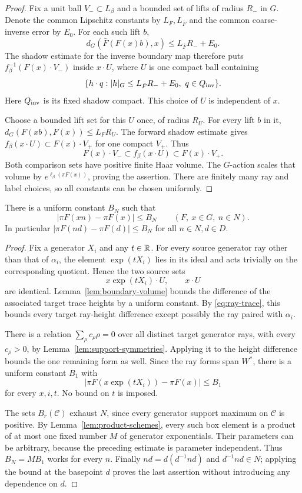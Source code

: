 \begin{proof}
Fix a unit ball $V_-\subset L_\beta$ and a bounded set of lifts
of radius $R_-$ in $G$.  Denote the common Lipschitz constants
by $L_F,L_{\bar F}$ and the common coarse-inverse error by $E_0$.
For each such lift $b$,
\[
 d_G(\bar F(F(x)b),x)\le L_{\bar F}R_-+E_0.
\]
The shadow estimate for the inverse boundary map therefore puts
$f_\beta^{-1}(F(x)\cdot V_-)$ inside $x\cdot U$, where $U$ is
one compact ball containing
\[
 \{h\cdot q:|h|_G\le L_{\bar F}R_-+E_0,\ q\in Q_{\rm inv}\}.
\]
Here $Q_{\rm inv}$ is its fixed shadow compact.
This choice of $U$ is independent of $x$.

Choose a bounded lift set for this $U$ once, of radius $R_U$.
For every lift $b$ in it,
$d_G(F(xb),F(x))\le L_FR_U$.
The forward shadow estimate gives
$f_\beta(x\cdot U)\subset F(x)\cdot V_+$ for one compact $V_+$.
Thus
\[
 F(x)\cdot V_-\subset f_\beta(x\cdot U)
 \subset F(x)\cdot V_+.
\]
Both comparison sets have positive finite Haar volume.
The $G$-action scales that volume by
$e^{\ell_\beta(\pi F(x))}$, proving the assertion.
There are finitely many ray and label choices, so all constants
can be chosen uniformly.
\end{proof}

\begin{lemma}
\label{lem:leaf-height}
There is a uniform constant $B_N$ such that
\[
 |\pi F(xn)-\pi F(x)|\le B_N
 \qquad(F,\ x\in G,\ n\in N).
\]
In particular $|\pi F(nd)-\pi F(d)|\le B_N$ for all $n\in N,d\in D$.
\end{lemma}

\begin{proof}
Fix a generator $X_i$ and any $t\in\mathbb R$.
For every source generator ray other than that of $\alpha_i$,
the element $\exp(tX_i)$ lies in its ideal and acts trivially
on the corresponding quotient.  Hence the two source sets
\[
 x\exp(tX_i)\cdot U,\qquad x\cdot U
\]
are identical.  Lemma~\ref{lem:boundary-volume} bounds the difference
of the associated target trace heights by a uniform constant.
By \eqref{eq:ray-trace}, this bounds every target ray-height
difference except possibly the ray paired with $\alpha_i$.

There is a relation $\sum_\rho c_\rho\rho=0$ over all distinct
target generator rays, with every $c_\rho>0$, by
Lemma~\ref{lem:support-symmetries}.  Applying it to the height
difference bounds the one remaining form as well.
Since the ray forms span $W^*$, there is a uniform constant
$B_1$ with
\[
 |\pi F(x\exp(tX_i))-\pi F(x)|\le B_1
\]
for every $x,i,t$.  No bound on $t$ is imposed.

The sets $B_r(\mathcal C)$ exhaust $N$, since every generator
support maximum on $\mathcal C$ is positive.  By
Lemma~\ref{lem:product-schemes}, every such box element is a
product of at most one fixed number $M$ of generator exponentials.
Their parameters can be arbitrary, because the preceding estimate
is parameter independent.  Thus $B_N=MB_1$ works for every $n$.
Finally $nd=d(d^{-1}nd)$ and $d^{-1}nd\in N$; applying the bound
at the basepoint $d$ proves the last assertion without introducing
any dependence on $d$.
\end{proof}

